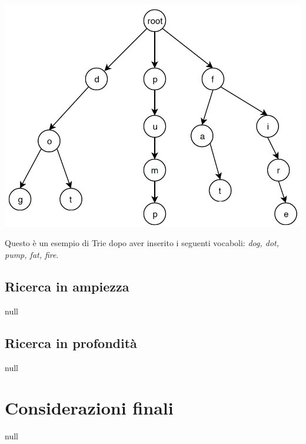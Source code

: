 \documentclass[10pt,a4paper]{article}
\begin{document}
	\begin{center}
		\includegraphics[scale=0.3]{trie}
		\\
		\begin{tiny}
		Questo è un esempio di Trie dopo aver inserito i seguenti vocaboli: \textit{dog, dot, pump, fat, fire}.
		\end{tiny}
	\end{center}

	\newpage
	\subsection{Ricerca in ampiezza}
	null
	\subsection{Ricerca in profondità}
	null
	\section{Considerazioni finali}
	null
\end{document}
